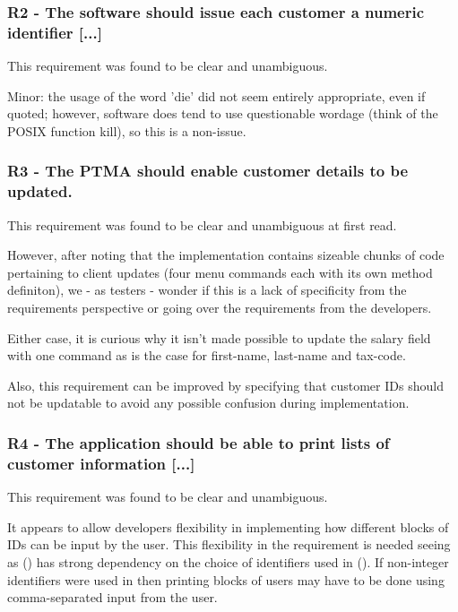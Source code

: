 \subsubsection{R2 - The software should issue each customer a numeric identifier [...]} 

This requirement was found to be clear and unambiguous. 
\par
Minor: the usage of the word 'die' did not seem entirely appropriate, even if quoted; however, software does tend to use questionable wordage (think of the POSIX function kill), so this is a non-issue.  

\subsubsection{R3 - The PTMA should enable customer details to be updated.}

This requirement was found to be clear and unambiguous at first read. 
\par
However, after noting that the implementation contains sizeable chunks of code pertaining to client updates (four menu commands each with its own method definiton), we - as testers - wonder if this is a lack of specificity from the requirements perspective or going over the requirements from the developers. 
\par
Either case, it is curious why it isn't made possible to update the salary field with one command as is the case for first-name, last-name and tax-code.  
\par
Also, this requirement can be improved by specifying that customer IDs should not be updatable to avoid any possible confusion during implementation. 

\subsubsection{R4 - The application should be able to print lists of customer information [...]} 
This requirement was found to be clear and unambiguous. 

It appears to allow developers flexibility in implementing how different blocks of IDs can be input by the user. This flexibility in the requirement is needed seeing as (\RFour) has strong dependency on the choice of identifiers used in (\RTwo). If non-integer identifiers were used in \RTwo \space then printing blocks of users may have to be done using comma-separated input from the user. 

